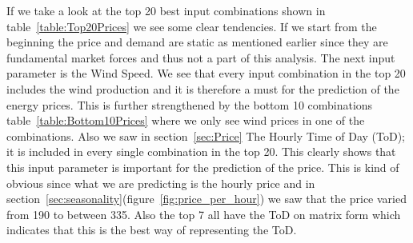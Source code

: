 If we take a look at the top 20 best input combinations shown in table~\ref{table:Top20Prices} we see some clear tendencies. If we start from the beginning the price and demand are static as mentioned earlier since they are fundamental market forces and thus not a part of this analysis. The next input parameter is the Wind Speed. We see that every input combination in the top 20 includes the wind production and it is therefore a must for the prediction of the energy prices. This is further strengthened by the bottom 10 combinations table~\ref{table:Bottom10Prices} where we only see wind prices in one of the combinations. Also we saw in section~\ref{sec:Price}
 The Hourly Time of Day (ToD); it is included in every single combination in the top 20. This clearly shows that this input parameter is important for the prediction of the price. This is kind of obvious since what we are predicting is the hourly price and in section~\ref{sec:seasonality}(figure~\ref{fig:price_per_hour}) we saw that the price varied from 190 to between 335. Also the top 7 all have the ToD on matrix form which indicates that this is the best way of representing the ToD.

\begin{table}[H]
\centering  %
\caption{The bottom 10 input combinations for price prediction} %
\label{table:Bottom10Prices} %
\end{table}

